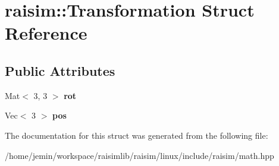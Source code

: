 \hypertarget{structraisim_1_1Transformation}{}\section{raisim\+:\+:Transformation Struct Reference}
\label{structraisim_1_1Transformation}
\subsection*{Public Attributes}
\begin{DoxyCompactItemize}
\item 
\mbox{\label{structraisim_1_1Transformation_a974029f58fd3db8dede9ad23b1297980}} 
Mat$<$ 3, 3 $>$ {\bfseries rot}
\item 
\mbox{\label{structraisim_1_1Transformation_a636b23ff1b963d3307b459f8fb128936}} 
Vec$<$ 3 $>$ {\bfseries pos}
\end{DoxyCompactItemize}


The documentation for this struct was generated from the following file\+:\begin{DoxyCompactItemize}
\item 
/home/jemin/workspace/raisimlib/raisim/linux/include/raisim/math.\+hpp\end{DoxyCompactItemize}
